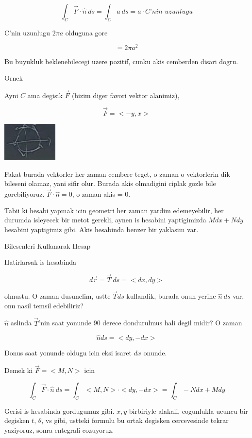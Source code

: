 \documentclass[12pt,fleqn]{article}
\begin{document}
\[ \int_C \vec{F} \cdot \hat{n} \ ds 
= \int_C a \ ds  = a \cdot \textit{C'nin uzunlugu}
\]

C'nin uzunlugu $2\pi a$ olduguna gore

\[ = 2\pi a^2 \]

Bu buyukluk beklenebilecegi uzere pozitif, cunku akis cemberden disari
dogru. 

Ornek

Ayni $C$ ama degisik $\vec{F}$ (bizim diger favori vektor alanimiz), 

\[ \vec{F} = <-y,x> \]

\includegraphics[height=2cm]{23_7.png}

Fakat burada vektorler her zaman cembere teget, o zaman o vektorlerin dik
bileseni olamaz, yani sifir olur. Burada akis olmadigini ciplak gozle bile
gorebiliyoruz. $\vec{F} \cdot \hat{n} = 0$, o zaman akis = 0. 

Tabii ki hesabi yapmak icin geometri her zaman yardim edemeyebilir, her
durumda isleyecek bir metot gerekli, aynen is hesabini yaptigimizda 
$Mdx +
Ndy$ hesabini yaptigimiz gibi. Akis hesabinda benzer bir yaklasim var. 

Bilesenleri Kullanarak Hesap

Hatirlarsak is hesabinda 

\[ d\vec{r} = \vec{T} \ ds = <dx,dy> \]

olmustu. O zaman dusunelim, ustte $\vec{T} ds$ kullandik, burada onun
yerine $\hat{n} \ ds$ var, onu nasil temsil edebiliriz? 

$\hat{n}$ aslinda $\vec{T}$'nin saat yonunde 90 derece dondurulmus hali
degil midir? O zaman 

\[ \hat{n}ds = <dy,-dx> \]

Donus saat yonunde oldugu icin eksi isaret $dx$ onunde. 

Demek ki $\vec{F} = <M,N>$ icin

\[ \int_C \vec{F} \cdot \hat{n} \ ds =
\int_C  <M,N> \cdot <dy,-dx> = 
\int_C -N dx + M dy
\]

Gerisi is hesabinda gordugumuz gibi. $x,y$ birbiriyle alakali, cogunlukla
ucuncu bir degisken $t$, $\theta$, vs gibi, ustteki formulu bu ortak
degisken cercevesinde tekrar yaziyoruz, sonra entegrali cozuyoruz. 
\end{document}
